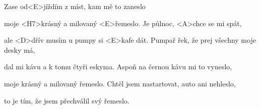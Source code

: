 
\zs

Zase od<E>jíždím z míst, kam mě to zaneslo

moje <H7>krásný a milovaný <E>řemeslo.
\ks
\zr
Je půlnoc, <A>chce se mi spát,

ale <D>dřív musím u pumpy si <E>kafe dát.
\kr
\zs
Pumpař řek, že prej všechny moje desky má,

dal mi kávu a k tomu čtyři eskyma.
\ks
\zr \kr
\zs
Aspoň na černou kávu mi to vyneslo,

moje krásný a milovaný řemeslo.
\ks
\zr \kr
\zs
Chtěl jsem nastartovat, auto ani nehleslo,

to je tím, že jsem přechválil svý řemeslo.
\ks
\zr \kr
\kp



